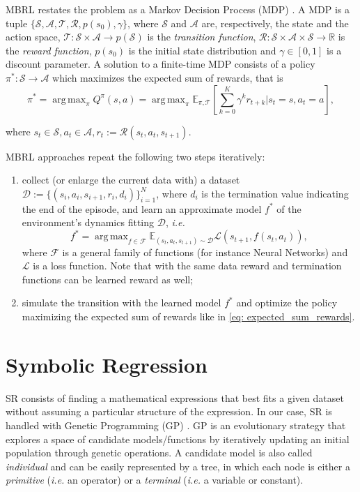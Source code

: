 \documentclass[11pt]{article}
\newcommand{\rr}{\mathbb{R}}
\DeclareMathOperator*{\argmax}{arg\,max}
\begin{document}
MBRL restates the problem as a Markov Decision Process (MDP) \cite{puterman2014}. A MDP is a tuple $\{\mathcal{S}, \mathcal{A}, \mathcal{T}, \mathcal{R}, p(s_0), \gamma\}$, where $\mathcal{S}$ and $\mathcal{A}$ are, respectively, the state and the action space, $\mathcal{T}: \mathcal{S} \times \mathcal{A} \rightarrow p(\mathcal{S})$ is the \textsl{transition function}, $\mathcal{R}: \mathcal{S} \times \mathcal{A} \times \mathcal{S} \rightarrow \rr$ is the \textsl{reward function}, $p(s_0)$ is the initial state distribution and $\gamma \in [0,1]$ is a discount parameter.
A solution to a finite-time MDP consists of a policy $\pi^*: \mathcal{S} \rightarrow \mathcal{A}$ which maximizes the expected sum of rewards, that is
\begin{equation}
	\pi^* = \argmax_{\pi} Q^{\pi}(s,a) = \argmax_{\pi} \mathbb{E}_{\pi, \mathcal{T}}\left[\sum_{k=0}^K \gamma^k r_{t+k} | s_t = s, a_t = a \right], \label{eq: expected_sum_rewards}
\end{equation}

where $s_t \in \mathcal{S}, a_t \in \mathcal{A}, r_t := \mathcal{R}(s_t, a_t, s_{t+1})$.

MBRL approaches repeat the following two steps iteratively:
\begin{enumerate}
	\item collect (or enlarge the current data with) a dataset $\mathcal{D} := \{(s_i, a_i, s_{i+1}, r_i, d_i)\}_{i=1}^N$, where $d_i$ is the termination value indicating the end of the episode, and learn an approximate model $f^*$ of the environment's dynamics fitting $\mathcal{D}$, \textsl{i.e.}
	\begin{equation}
		f^* = \argmax_{f \in \mathcal{F}} \mathbb{E}_{(s_t, a_t, s_{t+1}) \sim \mathcal{D}} \mathcal{L}(s_{t+1}, f(s_t, a_t)),
	\end{equation}
	where $\mathcal{F}$ is a general family of functions (for instance Neural Networks) and $\mathcal{L}$ is a loss function. Note that with the same data reward and termination functions can be learned reward as well;
	\item simulate the transition with the learned model $f^*$ and optimize the policy maximizing the expected sum of rewards like in \eqref{eq: expected_sum_rewards}.
\end{enumerate}

\section{Symbolic Regression}
SR consists of finding a mathematical expressions that best fits a given dataset without assuming a particular structure of the expression. 
In our case, SR is handled with Genetic Programming (GP) \cite{koza1994genetic, o2009riccardo}. GP is an evolutionary strategy that explores a space of candidate models/functions by iteratively updating an initial population through genetic operations. A candidate model is also called \textsl{individual} and can be easily represented by a tree, in which each node is either a \textsl{primitive} (\textsl{i.e.} an operator) or a \textsl{terminal} (\textsl{i.e.} a variable or constant).
\end{document}

